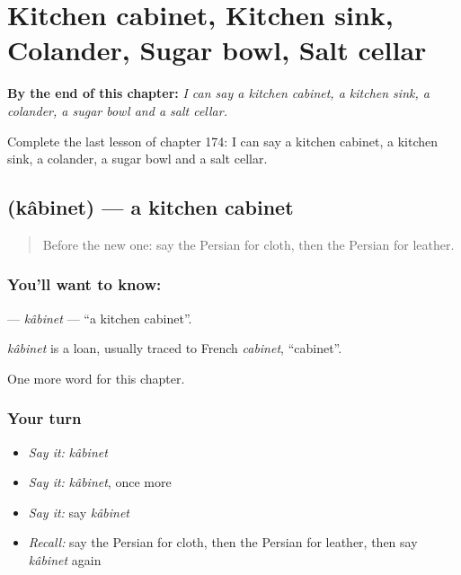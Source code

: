 
\chapter{Kitchen cabinet, Kitchen sink, Colander, Sugar bowl, Salt cellar}
\label{ch:fa-kitchen-cabinet-kitchen-sink-colander-sugar-bowl-salt-cellar}

\begin{chapteropening}
\textbf{By the end of this chapter:} \emph{I can say a kitchen cabinet, a kitchen sink, a colander, a sugar bowl and a salt cellar.}

Complete the last lesson of chapter 174: I can say a kitchen cabinet, a kitchen sink, a colander, a sugar bowl and a salt cellar.
\end{chapteropening}

\section[\texorpdfstring{\fa{کابینت} (kâbinet)}{کابینت (kâbinet)}]{ (kâbinet) — a kitchen cabinet}

\label{lesson:FA-C174-kabinet}



\begin{quote}
Before the new one: say the Persian for cloth, then the Persian for leather.
\end{quote}

\subsection*{You'll want to know: }
\textbf{} — \emph{kâbinet} — \textquotedblleft{}a kitchen cabinet\textquotedblright{}.

\begin{cousinweb}
\emph{kâbinet} is a loan, usually traced to French \emph{cabinet}, \textquotedblleft{}cabinet\textquotedblright{}.
\end{cousinweb}

\begin{grammarlens}[title={What you've built}]
One more word for this chapter.
\end{grammarlens}

\subsection*{Your turn}
\begin{itemize}
\raggedright
  \item \emph{Say it:} \emph{kâbinet}
  \item \emph{Say it:} \emph{kâbinet}, once more
  \item \emph{Say it:} say \emph{kâbinet}
  \item \emph{Recall:} say the Persian for cloth, then the Persian for leather, then say \emph{kâbinet} again
\end{itemize}

